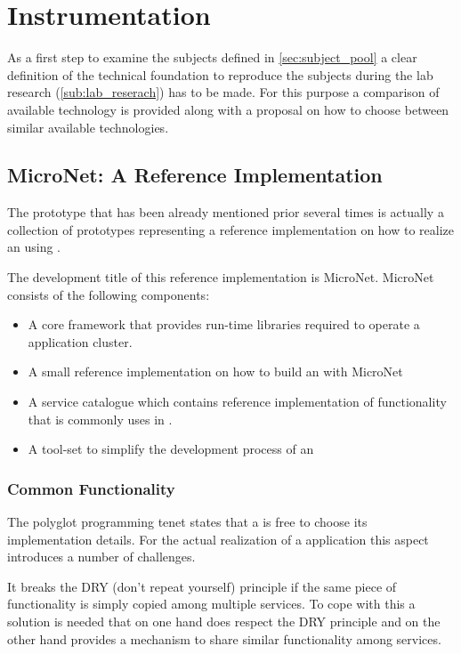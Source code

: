 \section{Instrumentation}

As a first step to examine the subjects defined in \autoref{sec:subject_pool} a
clear definition of the technical foundation to reproduce the subjects during
the lab research (\autoref{sub:lab_reserach}) has to be made. For this purpose a
comparison of available technology is provided along with a proposal on how to
choose between similar available technologies.

\subsection{MicroNet: A Reference Implementation}

The prototype that has been already mentioned prior 
several times is actually a collection of prototypes representing a reference
implementation on how to realize an \og{} using \ms{}.

The development title of this reference implementation is MicroNet.
MicroNet consists of the following components:

\begin{itemize}
  \item A core framework that provides run-time libraries required to operate a
  \ms{} \og{} application cluster.
  \item A small reference implementation on how to build an \og{} with MicroNet
  \item A service catalogue which contains reference implementation of
  functionality that is commonly uses in \ogs{}.
  \item A tool-set to simplify the development process of an \og{} 
\end{itemize}

\subsubsection{Common Functionality}

The polyglot programming tenet states that a \ms{} is free to choose its
implementation details. For the actual realization of a \ms{} application
this aspect introduces a number of challenges. 

It breaks the DRY (don't repeat yourself) principle if the same piece of
functionality is simply copied among multiple services. To cope with this a
solution is needed that on one hand does respect the DRY principle and on the
other hand provides a mechanism to share similar functionality among services.

